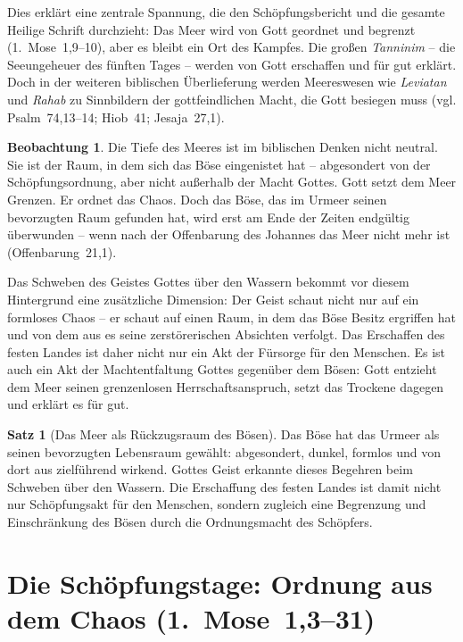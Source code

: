 ﻿\documentclass[a4paper,12pt]{article}
\theoremstyle{definition}
\newtheorem{theorem}{Satz}[section]
\newtheorem{observation}{Beobachtung}[section]
\begin{document}
Dies erklärt eine zentrale Spannung, die den Schöpfungsbericht und die gesamte
Heilige Schrift durchzieht: Das Meer wird von Gott geordnet und begrenzt
(1.~Mose~1,9--10), aber es bleibt ein Ort des Kampfes. Die großen \textit{Tanninim}
-- die Seeungeheuer des fünften Tages -- werden von Gott erschaffen und für gut
erklärt. Doch in der weiteren biblischen Überlieferung werden Meereswesen wie
\textit{Leviatan} und \textit{Rahab} zu Sinnbildern der gottfeindlichen Macht,
die Gott besiegen muss (vgl. Psalm~74,13--14; Hiob~41; Jesaja~27,1).

\begin{observation}
    Die Tiefe des Meeres ist im biblischen Denken nicht neutral. Sie ist der Raum,
    in dem sich das Böse eingenistet hat -- abgesondert von der Schöpfungsordnung,
    aber nicht außerhalb der Macht Gottes. Gott setzt dem Meer Grenzen. Er ordnet
    das Chaos. Doch das Böse, das im Urmeer seinen bevorzugten Raum gefunden hat,
    wird erst am Ende der Zeiten endgültig überwunden -- wenn nach der Offenbarung
    des Johannes das Meer nicht mehr ist (Offenbarung~21,1).
\end{observation}

Das Schweben des Geistes Gottes über den Wassern bekommt vor diesem Hintergrund
eine zusätzliche Dimension: Der Geist schaut nicht nur auf ein formloses Chaos --
er schaut auf einen Raum, in dem das Böse Besitz ergriffen hat und von dem aus
es seine zerstörerischen Absichten verfolgt. Das Erschaffen des festen Landes ist
daher nicht nur ein Akt der Fürsorge für den Menschen. Es ist auch ein Akt der
Machtentfaltung Gottes gegenüber dem Bösen: Gott entzieht dem Meer seinen
grenzenlosen Herrschaftsanspruch, setzt das Trockene dagegen und erklärt es
für gut.

\begin{theorem}[Das Meer als Rückzugsraum des Bösen]
    Das Böse hat das Urmeer als seinen bevorzugten Lebensraum gewählt: abgesondert,
    dunkel, formlos und von dort aus zielführend wirkend. Gottes Geist erkannte
    dieses Begehren beim Schweben über den Wassern. Die Erschaffung des festen Landes
    ist damit nicht nur Schöpfungsakt für den Menschen, sondern zugleich eine
    Begrenzung und Einschränkung des Bösen durch die Ordnungsmacht des Schöpfers.
\end{theorem}

\section{Die Schöpfungstage: Ordnung aus dem Chaos (1.~Mose~1,3--31)}
\end{document}
